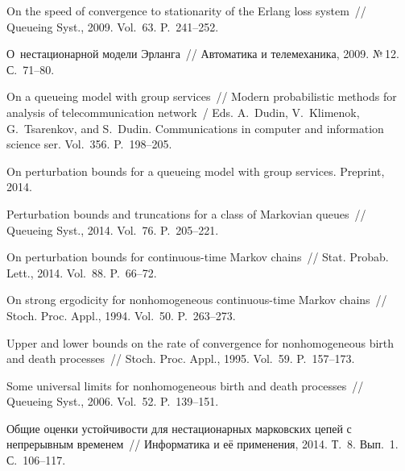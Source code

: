 {\begin{multicols}{2}
{{\begin{thebibliography}{99}
On the speed of convergence to stationarity of the Erlang loss system~//
Queueing Syst., 2009. Vol.~63. P.~241--252.


 О~нестационарной модели Эрланга~//
Автоматика и телемеханика, 2009. №\,12. С.~71--80.

 On a queueing model with group services~//
Modern probabilistic methods for
analysis of telecommunication network~/
Eds. A.~Dudin, V.~Klimenok, G.~Tsarenkov, and S.~Dudin.
Communications in computer and information science ser.
Vol.~356. P.~198--205.


On perturbation bounds for a queueing model with group services. Preprint, 2014.

Perturbation bounds and truncations for a class of Markovian queues~//
Queueing Syst., 2014. Vol.~76. P.~205--221.

On perturbation bounds for continuous-time Markov chains~//
Stat. Probab. Lett., 2014. Vol.~88. P.~66--72.

On strong ergodicity for nonhomogeneous continuous-time Markov chains~//
Stoch. Proc. Appl., 1994. Vol.~50. P.~263--273.

Upper and lower bounds on the rate of convergence for nonhomogeneous birth and death processes~//
Stoch. Proc. Appl., 1995. Vol.~59. P.~157--173.

Some universal limits for nonhomogeneous birth and death
processes~// Queueing Syst., 2006.  Vol.~52. P.~139--151.

Общие оценки устойчивости для нестационарных марковских цепей с непрерывным временем~//
Информатика и её применения, 2014. Т.~8. Вып.~1. С.~106--117.


\end{thebibliography}}}
\end{multicols}}
